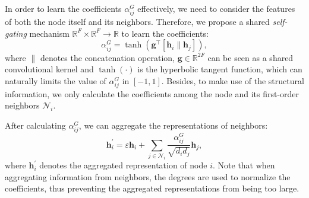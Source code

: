 \documentclass[letterpaper]{article} %
\begin{document}
In order to learn the coefficients $\alpha_{ij}^{G}$ effectively, we need to consider the features of both the node itself and its neighbors.
Therefore, we propose a shared \emph{self-gating} mechanism $\mathbb{R}^{F} \times \mathbb{R}^{F} \to \mathbb{R}$ to learn the coefficients:
\begin{equation}
\label{tanh}
	\alpha_{ij}^{G}=\tanh \left( \mathbf{g}^{\top} \left[ \mathbf{h}_{i} \parallel \mathbf{h}_{j} \right] \right),
\end{equation}
where $\parallel$ denotes the concatenation operation, $\mathbf{g} \in \mathbb{R}^{2F}$ can be seen as a shared convolutional kernel \cite{GAT} and $\tanh(\cdot)$ is the hyperbolic tangent function, which can naturally limits the value of $\alpha_{ij}^{G}$ in $[-1, 1]$. Besides, to make use of the structural information, we only calculate the coefficients among the node and its first-order neighbors $\mathcal{N}_{i}$.

After calculating $\alpha_{ij}^{G}$, we can aggregate the representations of neighbors:
\begin{equation}
\label{self-gating}
	\mathbf{h}_{i}^{'}= \varepsilon \mathbf{h}_{i} + \sum_{j \in \mathcal{N}_{i}} \frac{\alpha_{ij}^{G}}{\sqrt{d_{i}d_{j}}} \mathbf{h}_{j},
\end{equation}
where $\mathbf{h}_{i}^{'}$ denotes the aggregated representation of node $i$. Note that when aggregating information from neighbors, the degrees are used to normalize the coefficients, thus preventing the aggregated representations from being too large. 
\end{document}
